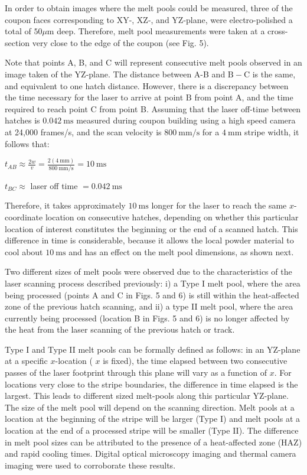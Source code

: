 \documentclass[10pt]{article}
\begin{document}
In order to obtain images where the melt pools could be measured, three of the coupon faces corresponding to XY-, XZ-, and YZ-plane, were electro-polished a total of $50 \mu \mathrm{m}$ deep. Therefore, melt pool measurements were taken at a cross-section very close to the edge of the coupon (see Fig. 5).

Note that points A, B, and C will represent consecutive melt pools observed in an image taken of the YZ-plane. The distance between A-B and $\mathrm{B}-\mathrm{C}$ is the same, and equivalent to one hatch distance. However, there is a discrepancy between the time necessary for the laser to arrive at point $\mathrm{B}$ from point $\mathrm{A}$, and the time required to reach point $\mathrm{C}$ from point B. Assuming that the laser off-time between hatches is $0.042 \mathrm{~ms}$ measured during coupon building using a high speed camera at 24,000 frames/s, and the scan velocity is $800 \mathrm{~mm} / \mathrm{s}$ for a $4 \mathrm{~mm}$ stripe width, it follows that:

$t_{A B} \approx \frac{2 w}{v}=\frac{2(4 \mathrm{~mm})}{800 \mathrm{~mm} / \mathrm{s}}=10 \mathrm{~ms}$

$t_{B C} \approx$ laser off time $=0.042 \mathrm{~ms}$

Therefore, it takes approximately $10 \mathrm{~ms}$ longer for the laser to reach the same $x$-coordinate location on consecutive hatches, depending on whether this particular location of interest constitutes the beginning or the end of a scanned hatch. This difference in time is considerable, because it allows the local powder material to cool about $10 \mathrm{~ms}$ and has an effect on the melt pool dimensions, as shown next.

Two different sizes of melt pools were observed due to the characteristics of the laser scanning process described previously: i) a Type I melt pool, where the area being processed (points A and C in Figs. 5 and 6) is still within the heat-affected zone of the previous hatch scanning, and ii) a type II melt pool, where the area currently being processed (location B in Figs. 5 and 6) is no longer affected by the heat from the laser scanning of the previous hatch or track.

Type I and Type II melt pools can be formally defined as follows: in an YZ-plane at a specific $x$-location ( $x$ is fixed), the time elapsed between two consecutive passes of the laser footprint through this plane will vary as a function of $x$. For locations very close to the stripe boundaries, the difference in time elapsed is the largest. This leads to different sized melt-pools along this particular YZ-plane. The size of the melt pool will depend on the scanning direction. Melt pools at a location at the beginning of the stripe will be larger (Type I) and melt pools at a location at the end of a processed stripe will be smaller (Type II). The difference in melt pool sizes can be attributed to the presence of a heat-affected zone (HAZ) and rapid cooling times. Digital optical microscopy imaging and thermal camera imaging were used to corroborate these results.
\end{document}
